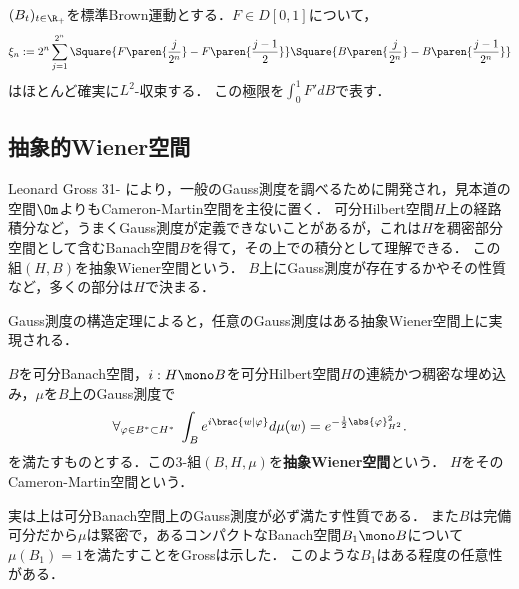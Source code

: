 \documentclass[uplatex,dvipdfmx]{jsreport}
\begin{document}
\begin{lemma}
    $(B_t)_{t\in\R_+}$を標準Brown運動とする．$F\in D[0,1]$について，
    \[\xi_n:=2^n\sum^{2^n}_{j=1}\Square{F\paren{\frac{j}{2^n}}-F\paren{\frac{j-1}{2}}}\Square{B\paren{\frac{j}{2^n}}-B\paren{\frac{j-1}{2^n}}}\]
    はほとんど確実に$L^2$-収束する．
    この極限を$\int^1_0F'dB$で表す．
\end{lemma}

\subsection{抽象的Wiener空間}

\begin{tcolorbox}[colframe=ForestGreen, colback=ForestGreen!10!white,breakable,colbacktitle=ForestGreen!40!white,coltitle=black,fonttitle=\bfseries\sffamily,
title=]
    Leonard Gross 31- により，一般のGauss測度を調べるために開発され，見本道の空間$\Om$よりもCameron-Martin空間を主役に置く．
    可分Hilbert空間$H$上の経路積分など，うまくGauss測度が定義できないことがあるが，これは$H$を稠密部分空間として含むBanach空間$B$を得て，その上での積分として理解できる．
    この組$(H,B)$を抽象Wiener空間という．
    $B$上にGauss測度が存在するかやその性質など，多くの部分は$H$で決まる．

    Gauss測度の構造定理によると，任意のGauss測度はある抽象Wiener空間上に実現される．
\end{tcolorbox}

\begin{definition}[Gross (67)]
    $B$を可分Banach空間，$i:H\mono B$を可分Hilbert空間$H$の連続かつ稠密な埋め込み，$\mu$を$B$上のGauss測度で
    \[\forall_{\varphi\in B^*\subset H^*}\;\int_Be^{i\brac{w|\varphi}}d\mu(w)=e^{-\frac{1}{2}\abs{\varphi}^2_{H^2}}.\]
    を満たすものとする．この3-組$(B,H,\mu)$を\textbf{抽象Wiener空間}という．
    $H$をそのCameron-Martin空間という．
\end{definition}
\begin{remarks}
    実は上は可分Banach空間上のGauss測度が必ず満たす性質である．
    また$B$は完備可分だから$\mu$は緊密で，あるコンパクトなBanach空間$B_1\mono B$について$\mu(B_1)=1$を満たすことをGrossは示した．
    このような$B_1$はある程度の任意性がある．
\end{remarks}
\end{document}

